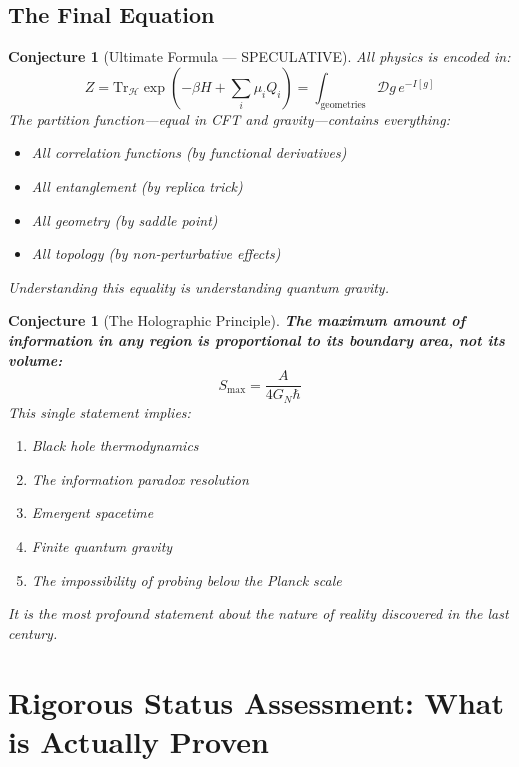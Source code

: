 \documentclass[12pt,a4paper]{article}
\newtheorem{conjecture}[theorem]{Conjecture}
\begin{document}
\subsection{The Final Equation}

\begin{conjecture}[Ultimate Formula --- SPECULATIVE]
All physics is encoded in:
\begin{equation}
\boxed{Z = \text{Tr}_{\mathcal{H}} \exp\left( -\beta H + \sum_i \mu_i Q_i \right) = \int_{\text{geometries}} \mathcal{D}g \, e^{-I[g]}}
\end{equation}
The partition function---equal in CFT and gravity---contains everything:
\begin{itemize}
    \item All correlation functions (by functional derivatives)
    \item All entanglement (by replica trick)
    \item All geometry (by saddle point)
    \item All topology (by non-perturbative effects)
\end{itemize}
Understanding this equality \textit{is} understanding quantum gravity.
\end{conjecture}

\begin{conjecture}[The Holographic Principle]
\textbf{The maximum amount of information in any region is proportional to its boundary area, not its volume:}
\begin{equation}
\boxed{S_{\max} = \frac{A}{4G_N \hbar}}
\end{equation}
This single statement implies:
\begin{enumerate}
    \item Black hole thermodynamics
    \item The information paradox resolution
    \item Emergent spacetime
    \item Finite quantum gravity
    \item The impossibility of probing below the Planck scale
\end{enumerate}
It is the most profound statement about the nature of reality discovered in the last century.
\end{conjecture}

\section{Rigorous Status Assessment: What is Actually Proven}\label{sec:honest-assessment}
\end{document}

